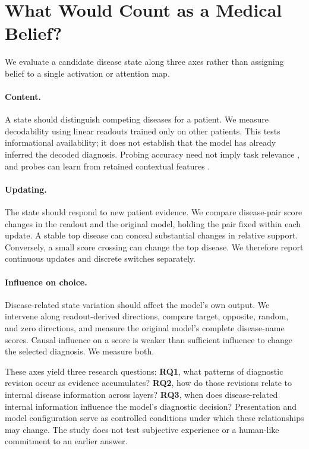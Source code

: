 \documentclass[11pt]{article}
\begin{document}
\section{What Would Count as a Medical Belief?}
\label{sec:belief}
We evaluate a candidate disease state along three axes rather than assigning belief to a single activation or attention map.

\paragraph{Content.} A state should distinguish competing diseases for a patient. We measure decodability using linear readouts trained only on other patients. This tests informational availability; it does not establish that the model has already inferred the decoded diagnosis. Probing accuracy need not imply task relevance \citep{probing}, and probes can learn from retained contextual features \citep{contextprobe}.

\paragraph{Updating.} The state should respond to new patient evidence. We compare disease-pair score changes in the readout and the original model, holding the pair fixed within each update. A stable top disease can conceal substantial changes in relative support. Conversely, a small score crossing can change the top disease. We therefore report continuous updates and discrete switches separately.

\paragraph{Influence on choice.} Disease-related state variation should affect the model's own output. We intervene along readout-derived directions, compare target, opposite, random, and zero directions, and measure the original model's complete disease-name scores. Causal influence on a score is weaker than sufficient influence to change the selected diagnosis. We measure both.

These axes yield three research questions: \textbf{RQ1}, what patterns of diagnostic revision occur as evidence accumulates? \textbf{RQ2}, how do those revisions relate to internal disease information across layers? \textbf{RQ3}, when does disease-related internal information influence the model's diagnostic decision? Presentation and model configuration serve as controlled conditions under which these relationships may change. The study does not test subjective experience or a human-like commitment to an earlier answer.
\end{document}
